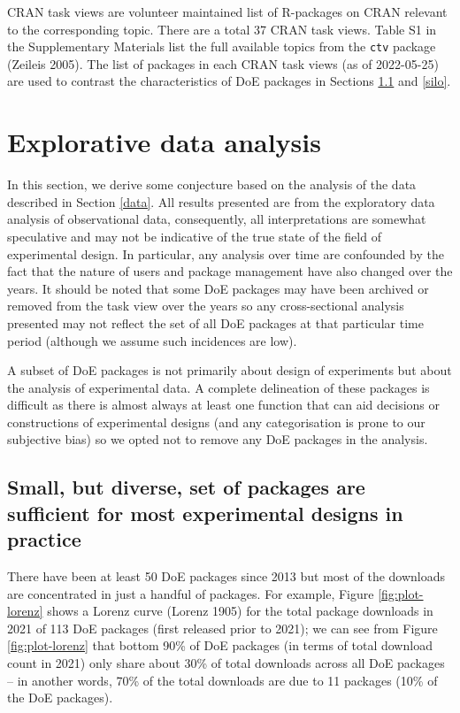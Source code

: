 \documentclass{article}
\begin{document}
CRAN task views are volunteer maintained list of R-packages on CRAN
relevant to the corresponding topic. There are a total 37 CRAN task
views. Table S1 in the Supplementary Materials list the full available
topics from the \texttt{ctv} package (Zeileis 2005). The list of
packages in each CRAN task views (as of 2022-05-25) are used to contrast
the characteristics of DoE packages in Sections \ref{popular} and
\ref{silo}.

\hypertarget{eda}{%
\section{Explorative data analysis}\label{eda}}

In this section, we derive some conjecture based on the analysis of the
data described in Section \ref{data}. All results presented are from the
exploratory data analysis of observational data, consequently, all
interpretations are somewhat speculative and may not be indicative of
the true state of the field of experimental design. In particular, any
analysis over time are confounded by the fact that the nature of users
and package management have also changed over the years. It should be
noted that some DoE packages may have been archived or removed from the
task view over the years so any cross-sectional analysis presented may
not reflect the set of all DoE packages at that particular time period
(although we assume such incidences are low).

A subset of DoE packages is not primarily about design of experiments
but about the analysis of experimental data. A complete delineation of
these packages is difficult as there is almost always at least one
function that can aid decisions or constructions of experimental designs
(and any categorisation is prone to our subjective bias) so we opted not
to remove any DoE packages in the analysis.

\hypertarget{popular}{%
\subsection{Small, but diverse, set of packages are sufficient for most
experimental designs in practice}\label{popular}}

There have been at least 50 DoE packages since 2013 but most of the
downloads are concentrated in just a handful of packages. For example,
Figure \ref{fig:plot-lorenz} shows a Lorenz curve (Lorenz 1905) for the
total package downloads in 2021 of 113 DoE packages (first released
prior to 2021); we can see from Figure \ref{fig:plot-lorenz} that bottom
90\% of DoE packages (in terms of total download count in 2021) only
share about 30\% of total downloads across all DoE packages -- in
another words, 70\% of the total downloads are due to 11 packages (10\%
of the DoE packages).
\end{document}
